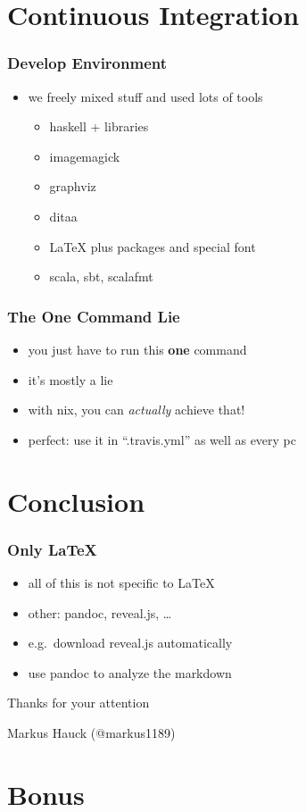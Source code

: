 \documentclass{beamer}
\begin{document}
\section{Continuous Integration}

\begin{frame}
  \frametitle{Develop Environment}
  \begin{itemize}
  \item we freely mixed stuff and used lots of tools
    \begin{itemize}
    \item haskell + libraries
    \item imagemagick
    \item graphviz
    \item ditaa
    \item LaTeX plus packages and special font
    \item scala, sbt, scalafmt
    \end{itemize}
  \end{itemize}
\end{frame}

\begin{frame}
  \frametitle{The One Command Lie}
  \begin{itemize}
  \item you just have to run this \textbf{one} command
  \item it's mostly a lie
  \item with nix, you can \textit{actually} achieve that!
  \item perfect: use it in ``.travis.yml'' as well as every pc
  \end{itemize}
\end{frame}

\section{Conclusion}\label{sec:conclusion}

\begin{frame}
  \frametitle{Only LaTeX}
  \begin{itemize}
  \item all of this is not specific to LaTeX
  \item other: pandoc, reveal.js, \ldots{}
  \item e.g.\ download reveal.js automatically
  \item use pandoc to analyze the markdown
  \end{itemize}
\end{frame}

\begin{frame}
  \begin{center}
    \Huge
    Thanks for your attention
  \end{center}
  \begin{center}
    \Huge
    Markus Hauck (@markus1189)
  \end{center}
\end{frame}

\begin{frame}
  \tableofcontents{}
\end{frame}

\appendix{}

\section*{Bonus}\label{sec:bonus}
\end{document}
